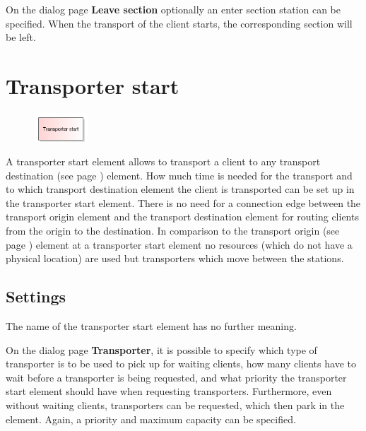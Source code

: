 On the dialog page \textbf{Leave section} optionally an enter section station can be specified.
When the transport of the client starts, the corresponding section will be left.


\section{Transporter start}
\label{ref:ModelElementTransportTransporterSource}

\begin{figure}
\vspace{-22pt}
\includegraphics[width=2cm]{imageModelElementTransportTransporterSource.png}
\vspace{-22pt}
\end{figure}

A transporter start element allows to transport a client to any
transport destination (see page \pageref{ref:ModelElementTransportDestination}) 
element. How much time is needed for the transport and to which
transport destination element the client is transported can be set up
in the transporter start element. 
There is no need for a connection edge between the transport origin element
and the transport destination element for routing clients from the origin to the
destination.
In comparison to the  transport origin (see page \pageref{ref:ModelElementTransportSource}) 
element at a transporter start element no resources (which do not have a physical location)
are used but transporters which move between the stations.

\subsection*{Settings}

The name of the transporter start element has no further meaning.

On the dialog page \textbf{Transporter}, it is possible to specify which type
of transporter is to be used to pick up for waiting clients, how many clients
have to wait before a transporter is being requested, and what priority the
transporter start element should have when requesting transporters.
Furthermore, even without waiting clients, transporters can be requested,
which then park in the element. Again, a priority and maximum capacity can be specified.

